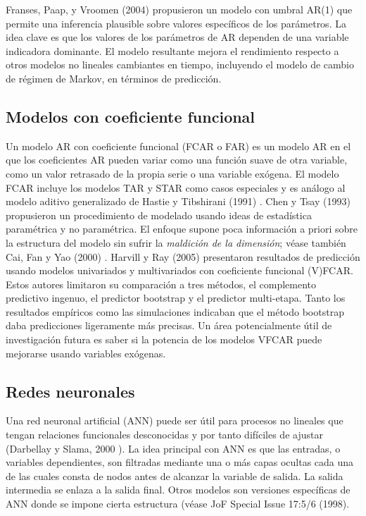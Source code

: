 \documentclass{llncs}
\begin{document}
Franses, Paap, y Vroomen (2004) \cite{Franses2004255} propusieron un modelo con umbral AR(1) que permite una inferencia plausible sobre valores específicos de los parámetros. La idea clave es que los valores de los parámetros de AR dependen de una variable indicadora dominante. El modelo resultante mejora el rendimiento respecto a otros modelos no lineales cambiantes en tiempo, incluyendo el modelo de cambio de régimen de Markov, en términos de predicción.

\subsection{Modelos con coeficiente funcional}
Un modelo AR con coeficiente funcional (FCAR o FAR) es un modelo AR en el que los coeficientes AR pueden variar como una función suave de otra variable, como un valor retrasado de la propia serie o una variable exógena. El modelo FCAR incluye los modelos TAR y STAR como casos especiales y es análogo al modelo aditivo generalizado de Hastie y Tibshirani (1991) \cite{Hastie1990}. Chen y Tsay (1993) \cite{Chen1993298} propusieron un procedimiento de modelado usando ideas de estadística paramétrica y no paramétrica. El enfoque supone poca información a priori sobre la estructura del modelo sin sufrir la \emph{maldición de la dimensión}; véase también Cai, Fan y Yao (2000) \cite{Cai2000941}. Harvill y Ray (2005) \cite{Harvill2005717} presentaron resultados de predicción usando modelos univariados y multivariados con coeficiente funcional (V)FCAR. Estos autores limitaron su comparación a tres métodos, el complemento predictivo ingenuo, el predictor bootstrap y el predictor multi-etapa. Tanto los resultados empíricos como las simulaciones indicaban que el método bootstrap daba predicciones ligeramente más precisas. Un área potencialmente útil de investigación futura es saber si la potencia de los modelos VFCAR puede mejorarse usando variables exógenas.

\subsection{Redes neuronales}
Una red neuronal artificial (ANN) puede ser útil para procesos no lineales que tengan relaciones funcionales desconocidas y por tanto difíciles de ajustar (Darbellay y Slama, 2000 \cite{Darbellay200071}). La idea principal con ANN es que las entradas, o variables dependientes, son filtradas mediante una o más capas ocultas cada una de las cuales consta de nodos antes de alcanzar la variable de salida. La salida intermedia se enlaza a la salida final. Otros modelos son versiones específicas de ANN donde se impone cierta estructura (véase JoF Special Issue 17:5/6 (1998).
\end{document}
